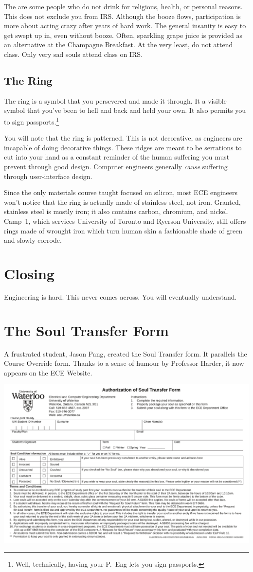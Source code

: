 \documentclass{book}
\begin{document}
The are some people who do not drink for religious, health, or personal reasons. This does not exclude you from IRS. Although the booze flows, participation is more about acting crazy after years of hard work. The general insanity is easy to get swept up in, even without booze. Often, sparkling grape juice is provided as an alternative at the Champagne Breakfast. At the very least, do not attend class. Only very sad souls attend class on IRS.

\section{The Ring}
The ring is a symbol that you persevered and made it through. It a visible symbol that you've been to hell and back and held your own. It also permits you to sign passports.\footnote{Well, technically, having your P.~Eng lets you sign passports.}

You will note that the ring is patterned. This is not decorative, as engineers are incapable of doing decorative things. These ridges are meant to be serrations to cut into your hand as a constant reminder of the human suffering you must prevent through good design. Computer engineers generally \emph{cause} suffering through user-interface design.

Since the only materials course taught focused on silicon, most ECE engineers won't notice that the ring is actually made of stainless steel, not iron. Granted, stainless steel is mostly iron; it also contains carbon, chromium, and nickel. Camp~1, which services University of Toronto and Ryerson University, still offers rings made of wrought iron which turn human skin a fashionable shade of green and slowly corrode.

\chapter{Closing}
Engineering is hard. This never comes across. You will eventually understand.


\appendix
\chapter{The Soul Transfer Form}
A frustrated student, Jason Pang, created the Soul Transfer form. It parallels the Course Override form. Thanks to a sense of humour by Professor Harder, it now appears on the ECE Website.

\vfil
\pagebreak

\noindent
\includegraphics[angle=90]{soul-transfer}
\end{document}
